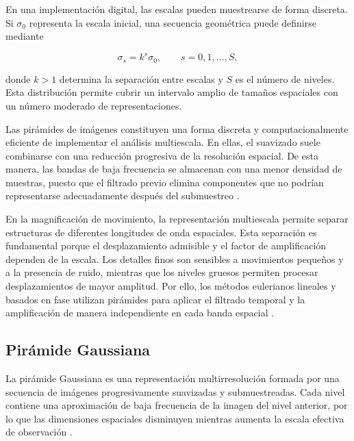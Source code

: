 En una implementación digital, las escalas pueden muestrearse de forma discreta. Si $\sigma_0$ representa la escala inicial, una secuencia geométrica puede definirse mediante

\begin{equation}
    \sigma_s
    =
    k^s\sigma_0,
    \qquad
    s=0,1,\ldots,S,
    \label{eq:muestreo_escala}
\end{equation}

donde $k>1$ determina la separación entre escalas y $S$ es el número de niveles. Esta distribución permite cubrir un intervalo amplio de tamaños espaciales con un número moderado de representaciones.

Las pirámides de imágenes constituyen una forma discreta y computacionalmente eficiente de implementar el análisis multiescala. En ellas, el suavizado suele combinarse con una reducción progresiva de la resolución espacial. De esta manera, las bandas de baja frecuencia se almacenan con una menor densidad de muestras, puesto que el filtrado previo elimina componentes que no podrían representarse adecuadamente después del submuestreo \cite{burt1983laplacian}.

En la magnificación de movimiento, la representación multiescala permite separar estructuras de diferentes longitudes de onda espaciales. Esta separación es fundamental porque el desplazamiento admisible y el factor de amplificación dependen de la escala. Los detalles finos son sensibles a movimientos pequeños y a la presencia de ruido, mientras que los niveles gruesos permiten procesar desplazamientos de mayor amplitud. Por ello, los métodos eulerianos lineales y basados en fase utilizan pirámides para aplicar el filtrado temporal y la amplificación de manera independiente en cada banda espacial \cite{wu2012eulerian,wadhwa2013phase,ahmed2023overview}.

	\subsection{Pirámide Gaussiana}
	\label{subsubsec:piramide_gaussiana}

La pirámide Gaussiana es una representación multirresolución formada por una secuencia de imágenes progresivamente suavizadas y submuestreadas. Cada nivel contiene una aproximación de baja frecuencia de la imagen del nivel anterior, por lo que las dimensiones espaciales disminuyen mientras aumenta la escala efectiva de observación \cite{burt1983laplacian,ahmed2023overview}.

